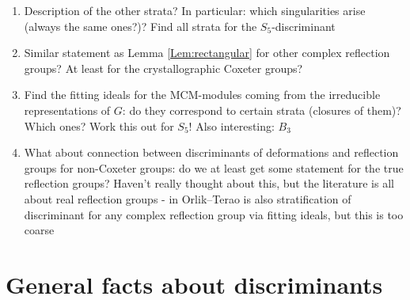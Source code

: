 \documentclass[letter,11pt]{amsart}
\newcommand{\ef}[1]{{\color{Cerulean} #1}}
\theoremstyle{theorem}
\theoremstyle{remark}
\theoremstyle{definition}
\begin{document}
\begin{enumerate}[1.]
\item Description of the other strata? In particular: which singularities arise (always the same ones?)? Find all strata for the $S_5$-discriminant
\item Similar statement as Lemma \ref{Lem:rectangular} for other complex reflection groups? At least for the crystallographic Coxeter groups?
\item Find the fitting ideals for the MCM-modules coming from the irreducible representations of $G$: do they correspond to certain strata (closures of them)? Which ones? Work this out for $S_5$! Also interesting: $B_3$
\item What about connection between discriminants of deformations and reflection groups for non-Coxeter groups: do we at least get some statement for the true reflection groups? \ef{Haven't really thought about this, but the literature is all about real reflection groups - in Orlik--Terao is also stratification of discriminant for any complex reflection group via fitting ideals, but this is too coarse}
\end{enumerate}

\section{General facts about discriminants}




\end{document}
